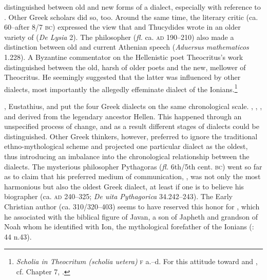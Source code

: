 distinguished between old and new forms of a dialect, especially with reference to . Other Greek scholars did so, too. Around the same time, the literary critic  (ca. 60–after 8/7 \textsc{bc}) expressed the view that  and Thucydides wrote in an older variety of  (\textit{De Lysia} 2). The philosopher  (\textit{fl.} ca. \textsc{ad} 190–210) also made a distinction between old and current Athenian speech (\textit{Aduersus mathematicos} 1.228). A Byzantine commentator on the Hellenistic poet Theocritus’s work distinguished between the old, harsh  of older poets and the new, mellower  of Theocritus. He seemingly suggested that the latter was influenced by other dialects, most importantly the allegedly effeminate dialect of the Ionians.\footnote{\textit{Scholia in Theocritum (scholia uetera)} \textsc{f} a.–d. For this attitude toward  and , cf. Chapter 7, .}

, Eustathius, and  put the four Greek dialects on the same chronological scale. , , , and  derived from the legendary ancestor Hellen. This happened through an unspecified process of change, and as a result different stages of dialects could be distinguished. Other Greek thinkers, however, preferred to ignore the traditional ethno-mythological scheme and projected one particular dialect as the oldest, thus introducing an imbalance into the chronological relationship between the dialects. The mysterious philosopher Pythagoras (\textit{fl.} 6th/5th cent. \textsc{bc}) went so far as to claim that his preferred medium of communication, , was not only the most harmonious but also the oldest Greek dialect, at least if one is to believe his biographer  (ca. \textsc{ad} 240–325; \textit{De uita Pythagorica} 34.242–243). The Early Christian author  (ca. 310/320–403) seems to have reserved this honor for , which he associated with the biblical figure of Javan, a son of Japheth and grandson of Noah whom he identified with Ion, the mythological forefather of the Ionians (\citealt{VanRooy2013}: 44 n.43).

